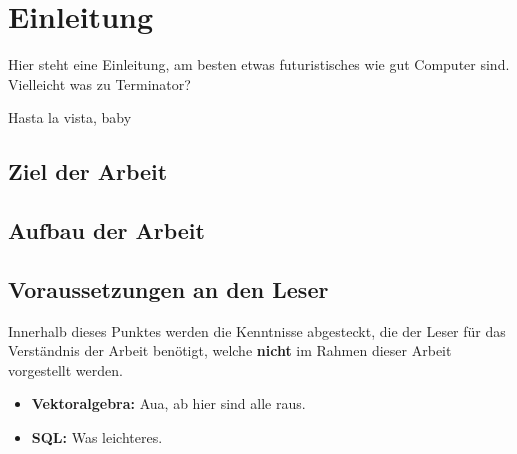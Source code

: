 \chapter{Einleitung}
\label{cha:Einleitung}
Hier steht eine Einleitung, am besten etwas futuristisches wie gut Computer sind. Vielleicht was zu Terminator? 

Hasta la vista, baby
\section{Ziel der Arbeit}
\label{sec:ZielDerArbeit}

\section{Aufbau der Arbeit}

\section{Voraussetzungen an den Leser}
\label{sec:Vorraussetzungen}
Innerhalb dieses Punktes werden die Kenntnisse abgesteckt, die der Leser für das Verständnis der Arbeit benötigt, welche \textbf{nicht} im Rahmen dieser Arbeit vorgestellt werden. 

\begin{itemize}
	\item \textbf{Vektoralgebra:} Aua, ab hier sind alle raus. 
		
	\item \textbf{SQL:} Was leichteres. 
\end{itemize}
